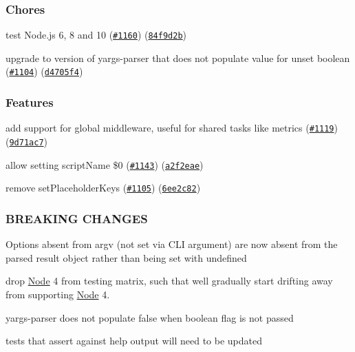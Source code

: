 \subsubsection*{Chores}


\begin{DoxyItemize}
\item test Node.\+js 6, 8 and 10 (\href{https://github.com/yargs/yargs/issues/1160}{\tt \#1160}) (\href{https://github.com/yargs/yargs/commit/84f9d2b}{\tt 84f9d2b})
\item upgrade to version of yargs-\/parser that does not populate value for unset boolean (\href{https://github.com/yargs/yargs/issues/1104}{\tt \#1104}) (\href{https://github.com/yargs/yargs/commit/d4705f4}{\tt d4705f4})
\end{DoxyItemize}

\subsubsection*{Features}


\begin{DoxyItemize}
\item add support for global middleware, useful for shared tasks like metrics (\href{https://github.com/yargs/yargs/issues/1119}{\tt \#1119}) (\href{https://github.com/yargs/yargs/commit/9d71ac7}{\tt 9d71ac7})
\item allow setting script\+Name \$0 (\href{https://github.com/yargs/yargs/issues/1143}{\tt \#1143}) (\href{https://github.com/yargs/yargs/commit/a2f2eae}{\tt a2f2eae})
\item remove {\ttfamily set\+Placeholder\+Keys} (\href{https://github.com/yargs/yargs/issues/1105}{\tt \#1105}) (\href{https://github.com/yargs/yargs/commit/6ee2c82}{\tt 6ee2c82})
\end{DoxyItemize}

\subsubsection*{B\+R\+E\+A\+K\+I\+NG C\+H\+A\+N\+G\+ES}


\begin{DoxyItemize}
\item Options absent from {\ttfamily argv} (not set via C\+LI argument) are now absent from the parsed result object rather than being set with {\ttfamily undefined}
\item drop \mbox{\hyperlink{classNode}{Node}} 4 from testing matrix, such that we\textquotesingle{}ll gradually start drifting away from supporting \mbox{\hyperlink{classNode}{Node}} 4.
\item yargs-\/parser does not populate \textquotesingle{}false\textquotesingle{} when boolean flag is not passed
\item tests that assert against help output will need to be updated
\end{DoxyItemize}


